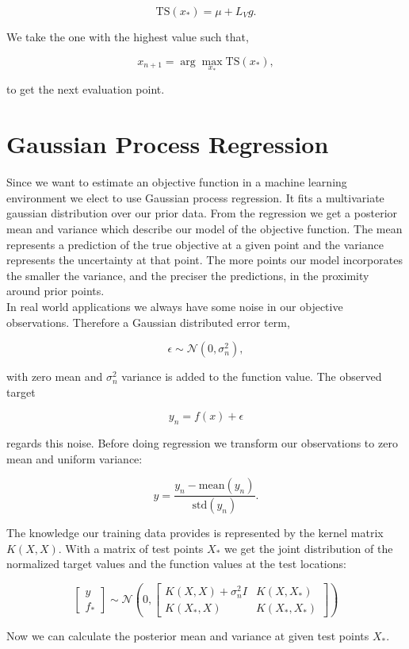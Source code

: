 $$\mathrm{TS}(x_*) = \mu + L_V g.$$

We take the one with the highest value such that,

$$x_{n+1} = \arg \max_{x_*} \mathrm{TS}(x_*),$$

to get the next evaluation point.

\section{Gaussian Process Regression}
Since we want to estimate an objective function in a machine learning environment we elect to use Gaussian process regression. It fits a multivariate gaussian distribution over our prior data. From the regression we get a posterior mean and variance which describe our model of the objective function. The mean represents a prediction of the true objective at a given point and the variance represents the uncertainty at that point. The more points our model incorporates the smaller the variance, and the preciser the predictions, in the proximity around prior points.\\
In real world applications we always have some noise in our objective observations. Therefore a Gaussian distributed error term,

$$\epsilon \sim \mathcal{N}(0,\sigma_n^2),$$

with zero mean and $\sigma_n^2$ variance is added to the function value. The observed target

$$y_{n} = f(x) + \epsilon$$

regards this noise. Before doing regression we transform our observations to zero mean and uniform variance:

$$y = \frac{y_{n}-\mathrm{mean}(y_{n})}{\mathrm{std}(y_{n})}.$$

The knowledge our training data provides is represented by the kernel matrix $K(X,X)$. With a matrix of test points $X_*$ we get the joint distribution of the normalized target values and the function values at the test locations:

$$\left[ \begin{array}{c} y \\ f_* \end{array} \right] \sim \mathcal{N} \left(0, \begin{bmatrix} K(X,X)+\sigma_n^2 I & K(X,X_*) \\ K(X_*,X) & K(X_*,X_*) \end{bmatrix} \right)$$

Now we can calculate the posterior mean and variance at given test points $X_*$.

